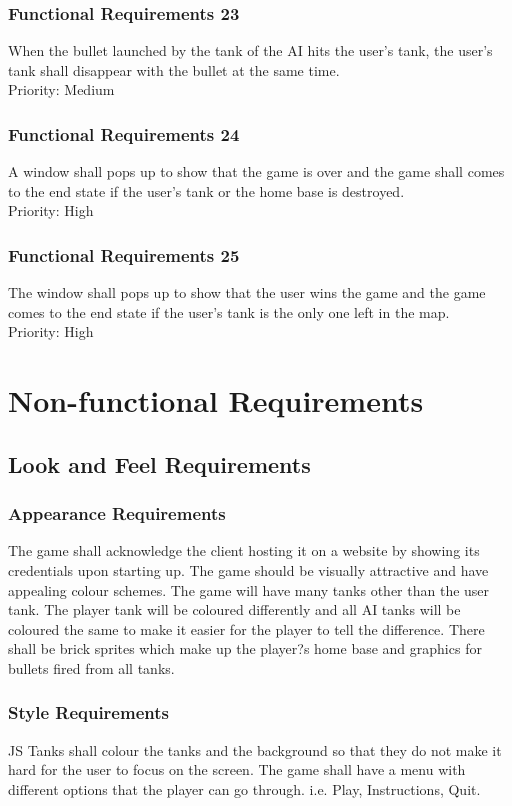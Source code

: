 \documentclass[12pt, titlepage]{article}
\begin{document}
\subsubsection{Functional Requirements 23} When the bullet launched by the tank of the AI hits the user's tank, 
 the user's tank shall disappear with the bullet at the same time.\\Priority: Medium
\subsubsection{Functional Requirements 24} A window shall pops up to show that the game is over and the game shall
 comes to the end state if the user's tank or the home base is destroyed.\\Priority: High
\subsubsection{Functional Requirements 25} The window shall pops up to show that the user wins the game and the game
 comes to the end state if the user's tank is the only one left in the map.\\Priority: High
\section{Non-functional Requirements}
\subsection{Look and Feel Requirements}
\subsubsection{Appearance Requirements}
The game shall acknowledge the client hosting it on a website by showing its
credentials upon starting up. The game should be visually attractive and have
appealing colour schemes. The game will have many tanks other than the user
tank. The player tank will be coloured differently and all AI tanks will be
coloured the same to make it easier for the player to tell the difference. There
shall be brick sprites which make up the player?s home base and graphics for
bullets fired from all tanks.
\subsubsection{Style Requirements}
JS Tanks shall colour the tanks and the background so that they do not make it
hard for the user to focus on the screen. The game shall have a menu with
different options that the player can go through. i.e. Play, Instructions, Quit.
\end{document}
